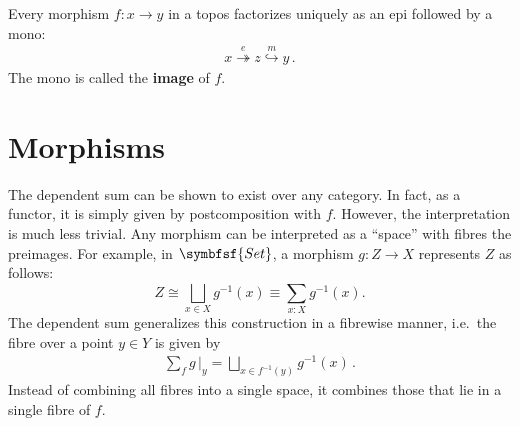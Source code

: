     \begin{property}
        Every morphism $f:x\rightarrow y$ in a topos factorizes uniquely as an epi followed by a mono:
        \begin{gather}
            x\overset{e}{\twoheadrightarrow}z\overset{m}{\hookrightarrow}y\,.
        \end{gather}
        The mono is called the \textbf{image} of $f$.
    \end{property}

\section{Morphisms}

    \begin{remark}
        The dependent sum can be shown to exist over any category. In fact, as a functor, it is simply given by postcomposition with $f$. However, the interpretation is much less trivial. Any morphism can be interpreted as a ``space'' with fibres the preimages. For example, in $\symbfsf{Set}$, a morphism $g:Z\rightarrow X$ represents $Z$ as follows: \[Z\cong\bigsqcup_{x\in X}g^{-1}(x)\equiv\sum_{x:X}g^{-1}(x).\] The dependent sum generalizes this construction in a fibrewise manner, i.e.~the fibre over a point $y\in Y$ is given by
        \begin{gather}
            \sum_fg\,\Big|_y = \bigsqcup_{x\in f^{-1}(y)}g^{-1}(x)\,.
        \end{gather}
        Instead of combining all fibres into a single space, it combines those that lie in a single fibre of $f$.
    \end{remark}

